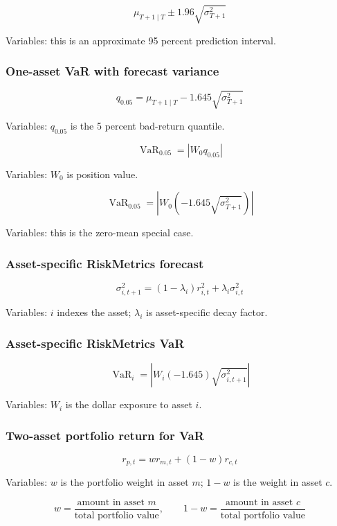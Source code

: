 \documentclass[
  8pt,
  twocolumn]{extarticle}
\begin{document}
\[
\mu_{T+1\mid T}\pm1.96\sqrt{\sigma_{T+1}^2}
\]

Variables: this is an approximate 95 percent prediction interval.

\subsubsection{One-asset VaR with forecast
variance}\label{one-asset-var-with-forecast-variance}

\[
q_{0.05}=\mu_{T+1\mid T}-1.645\sqrt{\sigma_{T+1}^2}
\]

Variables: \(q_{0.05}\) is the 5 percent bad-return quantile.

\[
\operatorname{VaR}_{0.05}=|W_0q_{0.05}|
\]

Variables: \(W_0\) is position value.

\[
\operatorname{VaR}_{0.05}=|W_0(-1.645\sqrt{\sigma_{T+1}^2})|
\]

Variables: this is the zero-mean special case.

\subsubsection{Asset-specific RiskMetrics
forecast}\label{asset-specific-riskmetrics-forecast}

\[
\sigma_{i,t+1}^2=(1-\lambda_i)r_{i,t}^2+\lambda_i\sigma_{i,t}^2
\]

Variables: \(i\) indexes the asset; \(\lambda_i\) is asset-specific
decay factor.

\subsubsection{Asset-specific RiskMetrics
VaR}\label{asset-specific-riskmetrics-var}

\[
\operatorname{VaR}_i=\left|W_i(-1.645)\sqrt{\sigma_{i,t+1}^2}\right|
\]

Variables: \(W_i\) is the dollar exposure to asset \(i\).

\subsubsection{Two-asset portfolio return for
VaR}\label{two-asset-portfolio-return-for-var}

\[
r_{p,t}=wr_{m,t}+(1-w)r_{c,t}
\]

Variables: \(w\) is the portfolio weight in asset \(m\); \(1-w\) is the
weight in asset \(c\).

\[
w=\frac{\text{amount in asset }m}{\text{total portfolio value}},\qquad
1-w=\frac{\text{amount in asset }c}{\text{total portfolio value}}
\]
\end{document}
